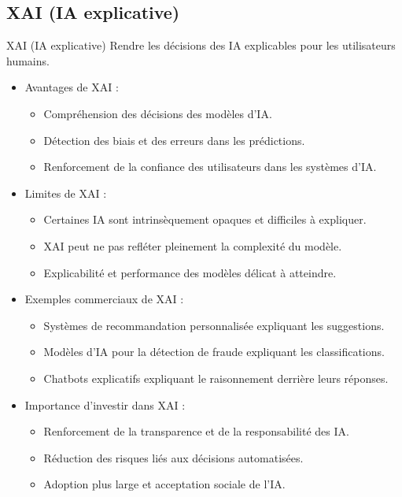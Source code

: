 \documentclass{beamer}
\begin{document}
\subsection{XAI (IA explicative)}
\begin{frame}{XAI (IA explicative)}
 Rendre les décisions des IA explicables pour les utilisateurs humains.
	\begin{itemize}
		\item Avantages de XAI :
		\begin{itemize}
			\item Compréhension des décisions des modèles d'IA.
			\item Détection des biais et des erreurs dans les prédictions.
			\item Renforcement de la confiance des utilisateurs dans les systèmes d'IA.
		\end{itemize}
		\item Limites de XAI :
		\begin{itemize}
			\item Certaines IA sont intrinsèquement opaques et difficiles à expliquer.
			\item XAI peut ne pas refléter pleinement la complexité du modèle.
			\item Explicabilité et performance des modèles délicat à atteindre.
		\end{itemize}
		\item Exemples commerciaux de XAI :
		\begin{itemize}
			\item Systèmes de recommandation personnalisée expliquant les suggestions.
			\item Modèles d'IA pour la détection de fraude expliquant les classifications.
			\item Chatbots explicatifs expliquant le raisonnement derrière leurs réponses.
		\end{itemize}
		\item Importance d'investir dans XAI :
		\begin{itemize}
			\item Renforcement de la transparence et de la responsabilité des IA.
			\item Réduction des risques liés aux décisions automatisées.
			\item Adoption plus large et acceptation sociale de l'IA.
		\end{itemize}
	\end{itemize}
\end{frame}
\end{document}
